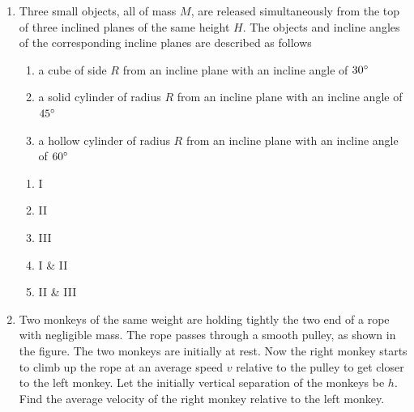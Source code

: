 \documentclass[12pt,letterpaper]{article}
\begin{document}
\begin{enumerate}[resume]

\item
Three small objects, all of mass $M$, are released simultaneously from the top of three inclined planes of the same height $H$. The objects and incline angles of the corresponding incline planes are described as follows
\begin{enumerate}[label=\Roman*.]
\item a cube of side $R$ from an incline plane with an incline angle of $30\degree$
\item a solid cylinder of radius $R$ from an incline plane with an incline angle of $45\degree$
\item a hollow cylinder of radius $R$ from an incline plane with an incline angle of $60\degree$
\end{enumerate}
\begin{enumerate}
\item I
\item II
\item III
\item I \& II
\item II \& III
\end{enumerate}

\vfill
\newpage

\item
Two monkeys of the same weight are holding tightly the two end of a rope with negligible mass. The rope passes through a smooth pulley, as shown in the figure. The two monkeys are initially at rest. Now the right monkey starts to climb up the rope at an average speed $v$ relative to the pulley to get closer to the left monkey. Let the initially vertical separation of the monkeys be $h$. Find the average velocity of the right monkey relative to the left monkey.

\begin{tabular}{l r}


\end{tabular}
\end{enumerate}
\end{document}
